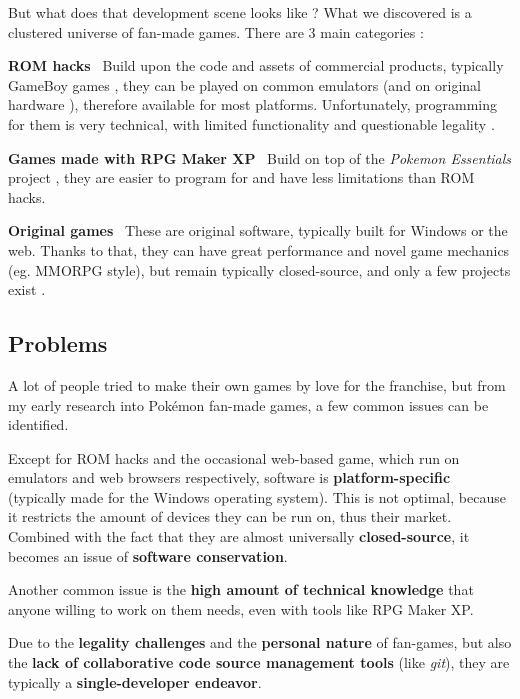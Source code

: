 \documentclass[11pt]{article}
\begin{document}
But what does that development scene looks like ? What we discovered is a clustered universe of fan-made games. There are 3 main categories : 

\textbf{ROM hacks} \ Build upon the code and assets of commercial products, typically GameBoy games \cite{PkmnFangames}, they can be played on common emulators (and on original hardware \cite{Homebrew}), therefore available for most platforms. Unfortunately, programming for them is very technical, with limited functionality and questionable legality \cite{PkmnRH}.

\textbf{Games made with RPG Maker XP} \ Build on top of the \textit{Pokemon Essentials} project \cite{PkmnFangames,Essentials}, they are easier to program for and have less limitations than ROM hacks.

\textbf{Original games} \  These are original software, typically built for Windows or the web. Thanks to that, they can have great performance and novel game mechanics (eg. MMORPG style), but remain typically closed-source, and only a few projects exist \cite{PkmnPlanet, PkmnLegends, PkmnFanGameList}.


\subsection{Problems}


A lot of people tried to make their own games by love for the franchise, but from my early research into Pokémon fan-made games, a few common issues can be identified.

Except for ROM hacks and the occasional web-based game, which run on emulators and web browsers respectively, software is \textbf{platform-specific} (typically made for the Windows operating system). This is not optimal, because it restricts the amount of devices they can be run on, thus their market. Combined with the fact that they are almost universally \textbf{closed-source}, it becomes an issue of \textbf{software conservation}.

Another common issue is the \textbf{high amount of technical knowledge} that anyone willing to work on them needs, even with tools like RPG Maker XP.

Due to the \textbf{legality challenges} and the \textbf{personal nature} of fan-games, but also the \textbf{lack of collaborative code source management tools} (like \textit{git}), they are typically a \textbf{single-developer endeavor}. 
\end{document}
